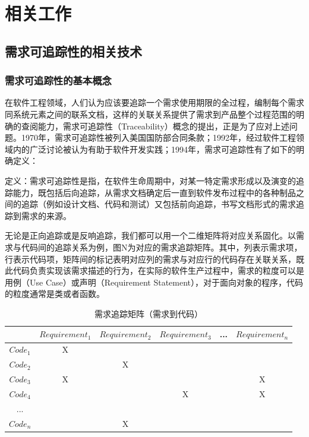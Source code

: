 \chapter{相关工作}

\section{需求可追踪性的相关技术}

\subsection{需求可追踪性的基本概念}

在软件工程领域，人们认为应该要追踪一个需求使用期限的全过程，编制每个需求同系统元素之间的联系文档，这样的关联关系提供了需求到产品整个过程范围的明确的查阅能力，需求可追踪性（Traceability）概念的提出，正是为了应对上述问题。1970年，需求可追踪性被列入美国国防部合同条款；1992年，经过软件工程领域内的广泛讨论被认为有助于软件开发实践；1994年，需求可追踪性有了如下的明确定义\cite{gotel1994analysis}：

定义：需求可追踪性是指，在软件生命周期中，对某一特定需求形成以及演变的追踪能力，既包括后向追踪，从需求文档确定后一直到软件发布过程中的各种制品之间的追踪（例如设计文档、代码和测试）又包括前向追踪，书写文档形式的需求追踪到需求的来源。

无论是正向追踪或是反响追踪，我们都可以用一个二维矩阵将对应关系固化。以需求与代码间的追踪关系为例，图N为对应的需求追踪矩阵。其中，列表示需求项，行表示代码项，矩阵间的标记表明对应列的需求与对应行的代码存在关联关系，既此代码负责实现该需求描述的行为，在实际的软件生产过程中，需求的粒度可以是用例（Use Case）或声明（Requirement Statement），对于面向对象的程序，代码的粒度通常是类或者函数。

\begin{table}[]
\centering
\caption{需求追踪矩阵（需求到代码）}
\label{my-label}
\begin{tabular}{@{}cccccc@{}}
\toprule
      & $Requirement_{1}$ & $Requirement_{2}$ & $Requirement_{3}$ & ... & $Requirement_{n}$ \\ \midrule
$Code_{1}$ & X            &              &              &     &              \\
$Code_{2}$ &              & X            &              &     &              \\
$Code_{3}$ & X            &              &              &     & X            \\
$Code_{4}$ &              &              & X            &     & X            \\
...   &              &              &              &     &              \\
$Code_{n}$ &              & X            &              &     &              \\ \bottomrule
\end{tabular}
\end{table}

